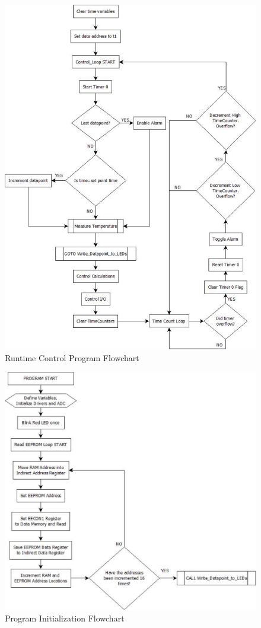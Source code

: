 \documentclass[10pt, twocolumn]{article}
\begin{document}
\begin{figure}
	\centering
	\includegraphics[width=\textwidth]{Figures/control-flowchart.pdf}
	\caption{Runtime Control Program Flowchart}
	\label{control-flowchart}
\end{figure}

\begin{figure}
	\centering
	\includegraphics[width=\columnwidth]{user-interface-flowchart-1.pdf}
	\caption{Program Initialization Flowchart}
	\label{user-interface-flowchart-1}
\end{figure}
\end{document}
